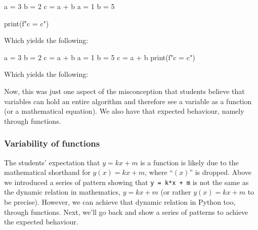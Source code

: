 \begin{description}
      \begin{minipage}[t]{0.45\columnwidth}
        \begin{pyblock}[varstateG1]
a = 3
b = 2
c = a + b
a = 1
b = 5

print(f"c = {c}")
        \end{pyblock}

        \vspace{0.5em}
        Which yields the following:
        \printpythontex[verbatim]
      \end{minipage}
      \hfill
      \begin{minipage}[t]{0.45\columnwidth}
        \begin{pyblock}[varstateG1][highlightlines=6]
a = 3
b = 2
c = a + b
a = 1
b = 5
c = a + b
print(f"c = {c}")
        \end{pyblock}

        \vspace{0.5em}
        Which yields the following:
        \printpythontex[verbatim]
      \end{minipage}
\end{description}

Now, this was just one aspect of the misconception that students believe that 
variables can hold an entire algorithm and therefore see a variable as a 
function (or a mathematical equation).
We also have that expected behaviour, namely through functions.

\subsubsection{Variability of functions}

The students' expectation that \(y = kx + m\) is a function 
\parencite{Kohn2017VariableEvaluation,Plass2015Variables,Doukakis2007} is 
likely due to the mathematical shorthand for \(y(x) = kx + m\), where 
\enquote{\((x)\)} is dropped.
Above we introduced a series of pattern showing that
\texttt{y = k*x + m}
is not the same as the dynamic relation in mathematics,
\(y = kx + m\) (or rather \(y(x) = kx + m\) to be precise).
However, we can achieve that dynamic relation in Python too, through functions.
Next, we'll go back and show a series of patterns to achieve the expected 
behaviour.

